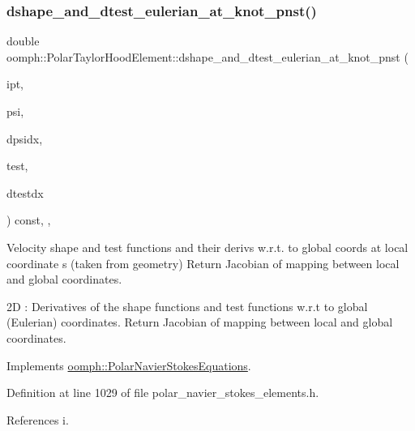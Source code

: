 \subsubsection{\texorpdfstring{dshape\+\_\+and\+\_\+dtest\+\_\+eulerian\+\_\+at\+\_\+knot\+\_\+pnst()}{dshape\_and\_dtest\_eulerian\_at\_knot\_pnst()}}
{\footnotesize\ttfamily double oomph\+::\+Polar\+Taylor\+Hood\+Element\+::dshape\+\_\+and\+\_\+dtest\+\_\+eulerian\+\_\+at\+\_\+knot\+\_\+pnst (\begin{DoxyParamCaption}\item[{const unsigned \&}]{ipt,  }\item[{\hyperlink{classoomph_1_1Shape}{Shape} \&}]{psi,  }\item[{\hyperlink{classoomph_1_1DShape}{D\+Shape} \&}]{dpsidx,  }\item[{\hyperlink{classoomph_1_1Shape}{Shape} \&}]{test,  }\item[{\hyperlink{classoomph_1_1DShape}{D\+Shape} \&}]{dtestdx }\end{DoxyParamCaption}) const\hspace{0.3cm}{\ttfamily [inline]}, {\ttfamily [protected]}, {\ttfamily [virtual]}}



Velocity shape and test functions and their derivs w.\+r.\+t. to global coords at local coordinate s (taken from geometry) Return Jacobian of mapping between local and global coordinates. 

2D \+: Derivatives of the shape functions and test functions w.\+r.\+t to global (Eulerian) coordinates. Return Jacobian of mapping between local and global coordinates. 

Implements \hyperlink{classoomph_1_1PolarNavierStokesEquations_a7fda7aac0b9eb09410dfff38f992374c}{oomph\+::\+Polar\+Navier\+Stokes\+Equations}.



Definition at line 1029 of file polar\+\_\+navier\+\_\+stokes\+\_\+elements.\+h.



References i.

\mbox{\label{classoomph_1_1PolarTaylorHoodElement_a5f7b5059497c7d24e5804e1ff9cd34b2}} 
